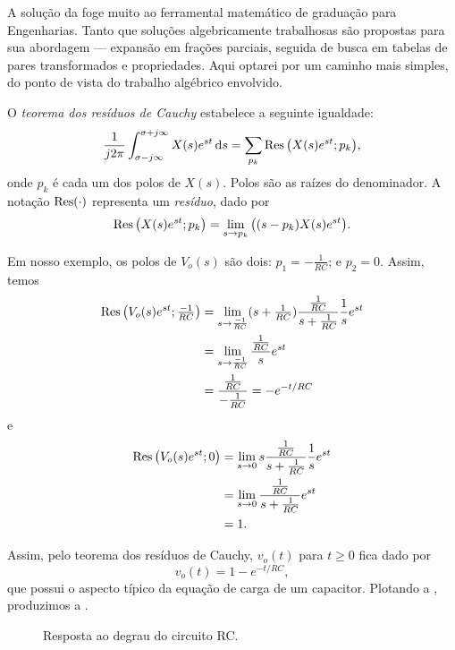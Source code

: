 A solução da  foge muito ao ferramental matemático de graduação para Engenharias. Tanto que soluções algebricamente trabalhosas são propostas para sua abordagem --- expansão em frações parciais, seguida de busca em tabelas de pares transformados e propriedades. Aqui optarei por um caminho mais simples, do ponto de vista do trabalho algébrico envolvido.

O \emph{teorema dos resíduos de Cauchy} estabelece a seguinte igualdade:
\begin{equation}\label{eq:cauchy}
	\frac{1}{j2\pi}\inte{X(s)e^{st}}{s}{\sigma-j\infty}{\sigma+j\infty}=\sum_{p_k}\res\big(X(s)e^{st};p_k\big),
\end{equation}
onde $p_k$ é cada um dos polos de $X(s)$. Polos são as raízes do denominador. A notação $\res(\cdot)$ representa um \emph{resíduo}, dado por
\begin{equation}\label{eq:res}
	\res\big(X(s)e^{st};p_k\big)=\lim_{s\to p_k}\big((s-p_k)X(s)e^{st}\big).
\end{equation}

Em nosso exemplo, os polos de $V_o(s)$ são dois: $p_1=-\frac{1}{RC}$; e $p_2=0$. Assim, temos
\begin{align*}
	\res\big(V_o(s)e^{st};{\textstyle\frac{-1}{RC}}\big)&=\lim_{s\to\frac{-1}{RC}}({\textstyle s+\frac{1}{RC}})\frac{\frac{1}{RC}}{s+\frac{1}{RC}}\frac{1}{s}e^{st}\\
	&=\lim_{s\to\frac{-1}{RC}}\frac{\frac{1}{RC}}{s}e^{st}\\
	&=\frac{\frac{1}{RC}}{-\frac{1}{RC}}=-e^{-t\slash RC}
\end{align*}
e
\begin{align*}
	\res\big(V_o(s)e^{st};0\big)&=\lim_{s\to0}s\frac{\frac{1}{RC}}{s+\frac{1}{RC}}\frac{1}{s}e^{st}\\
	&=\lim_{s\to0}\frac{\frac{1}{RC}}{s+\frac{1}{RC}}e^{st}\\
	&=1.
\end{align*}

Assim, pelo teorema dos resíduos de Cauchy, $v_o(t)$ para $t\geq0$ fica dado por
\begin{equation}\label{eq:cc}
	v_o(t)=1-e^{-t/RC},
\end{equation}
que possui o aspecto típico da equação de carga de um capacitor. Plotando a , produzimos a .

\begin{figure}[ht]
	\centering
	\caption{Resposta ao degrau do circuito RC.}
	\label{fig:cc}
\end{figure}

